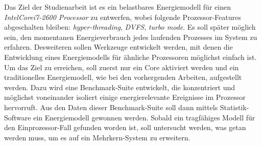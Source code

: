 \documentclass[a4paper,DIV=15]{scrartcl}
\newcommand{\JWemph}[1]{\emph{#1}}
\newcommand{\JWproduct}[1]{\JWemph{#1}}
\newcommand{\JWlone}[1]{}
\def\TReg{\textsuperscript{\textregistered}}
\def\TTra{\textsuperscript{\texttrademark}}
\begin{document}
Das Ziel der Studienarbeit ist es ein belastbares Energiemodell für einen
\JWproduct{Intel\TReg Core\TTra i7-2600 Processor} zu
entwerfen, wobei folgende Prozessor-Features abgeschalten bleiben:
\JWemph{hyper-threading}, \JWemph{DVFS}, \JWemph{turbo mode}. Es soll später
möglich sein, den momentanen Energieverbrauch jedes laufenden Prozesses im
System zu erfahren. Desweiteren sollen Werkzeuge entwickelt werden, mit denen
die Entwicklung eines Energiemodells für ähnliche Prozessoren möglichst einfach
ist.\\


\JWlone{Lösungsansatz}

Um das Ziel zu erreichen, soll zuerst nur ein Core aktiviert werden und ein
traditionelles Energiemodell, wie bei den vorhergenden Arbeiten, aufgestellt
werden. Dazu wird eine Benchmark-Suite entwickelt, die konzentriert und
möglichst voneinander isoliert einige energierelevante Ereignisse im Prozessor
hervorruft. Aus den Daten dieser Benchmark-Suite soll dann mittels
Statistik-Software ein Energiemodell gewonnen werden. Sobald ein tragfähiges
Modell für den Einprozessor-Fall gefunden worden ist, soll untersucht werden,
was getan werden muss, um es auf ein Mehrkern-System zu erweitern.\\
\end{document}
